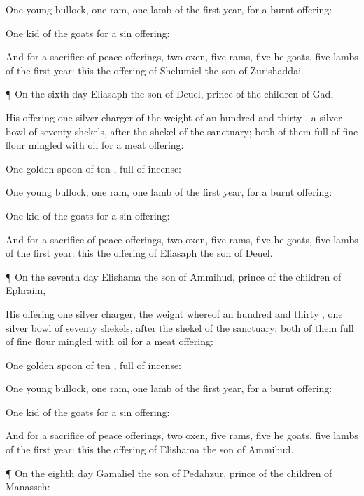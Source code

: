 {One
young
bullock,
one
ram,
one
lamb of the
first
year, for a burnt
offering:

One
kid of the
goats for a sin
offering:

And for a
sacrifice of peace
offerings,
two
oxen,
five
rams,
five he
goats,
five
lambs of the
first
year: this
{} the
offering of
Shelumiel the
son of
Zurishaddai.


\par }{\PP {}¶ On the
sixth
day
Eliasaph the
son of
Deuel,
prince of the
children of
Gad,
{}

His
offering
{}
one
silver
charger of the
weight of an
hundred and
thirty
{}, a
silver
bowl of
seventy
shekels, after the
shekel of the
sanctuary;
both of them
full of fine
flour
mingled with
oil for a meat
offering:

One
golden
spoon of
ten
{},
full of
incense:

One
young
bullock,
one
ram,
one
lamb of the
first
year, for a burnt
offering:

One
kid of the
goats for a sin
offering:

And for a
sacrifice of peace
offerings,
two
oxen,
five
rams,
five he
goats,
five
lambs of the
first
year: this
{} the
offering of
Eliasaph the
son of
Deuel.


\par }{\PP {}¶ On the
seventh
day
Elishama the
son of
Ammihud,
prince of the
children of
Ephraim,
{}

His
offering
{}
one
silver
charger, the
weight whereof
{} an
hundred and
thirty
{},
one
silver
bowl of
seventy
shekels, after the
shekel of the
sanctuary;
both of them
full of fine
flour
mingled with
oil for a meat
offering:

One
golden
spoon of
ten
{},
full of
incense:

One
young
bullock,
one
ram,
one
lamb of the
first
year, for a burnt
offering:

One
kid of the
goats for a sin
offering:

And for a
sacrifice of peace
offerings,
two
oxen,
five
rams,
five he
goats,
five
lambs of the
first
year: this
{} the
offering of
Elishama the
son of
Ammihud.


\par }{\PP {}¶ On the
eighth
day
{}
Gamaliel the
son of
Pedahzur,
prince of the
children of
Manasseh:

}
